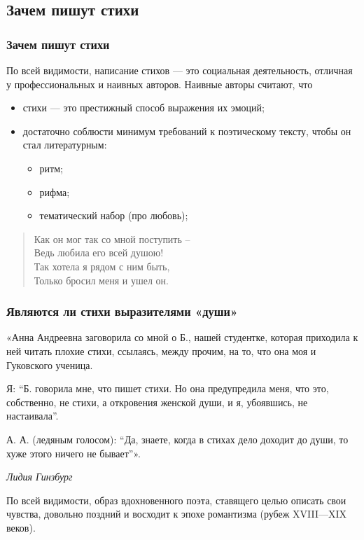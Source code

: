 \documentclass{beamer}
\begin{document}
\subsection{Зачем пишут стихи}\label{sec:why} %


\begin{frame}
\frametitle{Зачем пишут стихи}
По всей видимости, написание стихов — это социальная деятельность, отличная у профессиональных и наивных авторов.
Наивные авторы считают, что
\begin{itemize}
\item стихи — это престижный способ выражения их эмоций;
\item достаточно соблюсти минимум требований к поэтическому тексту, чтобы он стал литературным:
\begin{itemize}
\item ритм;
\item рифма;
\item тематический набор (про любовь);
\end{itemize}
\end{itemize}

\begin{verse}
Как он мог так со мной поступить –\\
Ведь любила его всей душою!\\
Так хотела я рядом с ним быть,\\
Только бросил меня и ушел он.\\
\end{verse}

\end{frame}


\begin{frame}
\frametitle{Являются ли стихи выразителями «души»}
«Анна Андреевна заговорила со мной о Б., нашей студентке, которая приходила к ней читать плохие стихи, ссылаясь, между прочим, на то, что она моя и Гуковского ученица.

Я: “Б. говорила мне, что пишет стихи. Но она предупредила меня, что это, собственно, не стихи, а откровения женской души, и я, убоявшись, не настаивала”.

А. А. (ледяным голосом): “Да, знаете, когда в стихах дело доходит до души, то хуже этого ничего не бывает”».

\textit{Лидия Гинзбург}

\begin{flushleft}
По всей видимости, образ вдохновенного поэта, ставящего целью описать свои чувства, довольно поздний и восходит к эпохе романтизма (рубеж XVIII—XIX веков).
\end{flushleft}


\end{frame}
\end{document}
